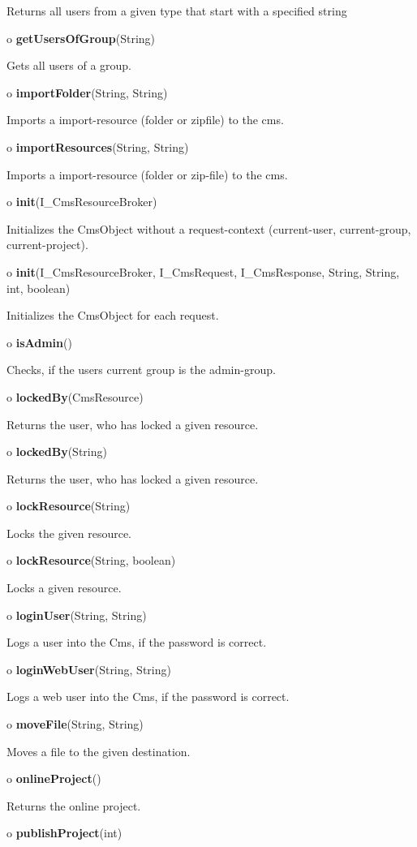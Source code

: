 \begin{description}
Returns all users from a given type that start with a specified string  
\item o {\bf getUsersOfGroup}(String)  

Gets all users of a group.  
\item o {\bf importFolder}(String, String)  

Imports a import-resource (folder or zipfile) to the cms.  
\item o {\bf importResources}(String, String)  

Imports a import-resource (folder or zip-file) to the cms.  
\item o {\bf init}(I\_CmsResourceBroker)  

Initializes the CmsObject without a request-context (current-user,
current-group, current-project).  
\item o {\bf init}(I\_CmsResourceBroker, I\_CmsRequest, I\_CmsResponse,
String, String, int, boolean)  

Initializes the CmsObject for each request.  
\item o {\bf isAdmin}()  

Checks, if the users current group is the admin-group.  
\item o {\bf lockedBy}(CmsResource)  

Returns the user, who has locked a given resource.  
\item o {\bf lockedBy}(String)  

Returns the user, who has locked a given resource.  
\item o {\bf lockResource}(String)  

Locks the given resource.  
\item o {\bf lockResource}(String, boolean)  

Locks a given resource.  
\item o {\bf loginUser}(String, String)  

Logs a user into the Cms, if the password is correct.  
\item o {\bf loginWebUser}(String, String)  

Logs a web user into the Cms, if the password is correct.  
\item o {\bf moveFile}(String, String)  

Moves a file to the given destination.  
\item o {\bf onlineProject}()  

Returns the online project.  
\item o {\bf publishProject}(int)  


\end{description}
